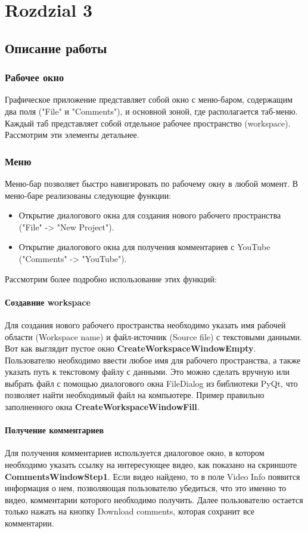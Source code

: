 \chapter{Rozdzial 3}

\section{Описание работы}
	\subsection{Рабочее окно}
		Графическое приложение представляет собой окно с меню-баром, содержащим два поля ("File" и "Comments"), и основной зоной, где располагается таб-меню. Каждый таб представляет собой отдельное рабочее пространство (workspace). Рассмотрим эти элементы детальнее.
		
	\subsection{Меню}
		Меню-бар позволяет быстро навигировать по рабочему окну в любой момент. В меню-баре реализованы следующие функции:
		\begin{itemize}
			\item Открытие диалогового окна для создания нового рабочего пространства ("File" -> "New Project").
			\item Открытие диалогового окна для получения комментариев с YouTube ("Comments" -> "YouTube").
		\end{itemize}

		Рассмотрим более подробно использование этих функций:
		
		\subsubsection{Создавние workspace}
			Для создания нового рабочего пространства необходимо указать имя рабочей области (Workspace name) и файл-источник (Source file) с текстовыми данными. Вот как выглядит пустое окно \textbf{CreateWorkspaceWindowEmpty}. Пользователю необходимо ввести любое имя для рабочего пространства, а также указать путь к текстовому файлу с данными. Это можно сделать вручную или выбрать файл с помощью диалогового окна FileDialog из библиотеки PyQt, что позволяет найти необходимый файл на компьютере. Пример правильно заполненного окна \textbf{CreateWorkspaceWindowFill}.
		
		\subsubsection{Получение комментариев}
			Для получения комментариев используется диалоговое окно, в котором необходимо указать ссылку на интересующее видео, как показано на скриншоте \textbf{CommentsWindowStep1}. Если видео найдено, то в поле Video Info появится информация о нем, позволяющая пользователю убедиться, что это именно то видео, комментарии которого необходимо получить. Далее пользователю остается только нажать на кнопку Download comments, которая сохранит все комментарии.
				
